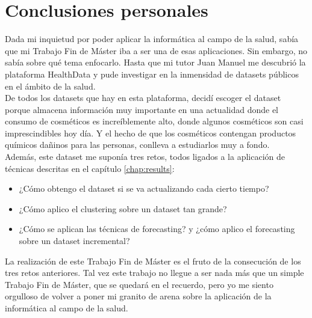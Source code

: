 \newpage
\section{Conclusiones personales}

Dada mi inquietud por poder aplicar la informática al campo de la salud, sabía que mi Trabajo Fin de Máster iba a ser una de esas aplicaciones. Sin embargo, no sabía sobre qué tema enfocarlo. Hasta que mi tutor Juan Manuel me descubrió la plataforma HealthData \citep{healthdata} y pude investigar en la inmensidad de datasets públicos en el ámbito de la salud. \\

De todos los datasets que hay en esta plataforma, decidí escoger el dataset  \citep{dataset} porque almacena información muy importante en una actualidad donde el consumo de cosméticos es increíblemente alto, donde algunos cosméticos son casi imprescindibles hoy día. Y el hecho de que los cosméticos contengan productos químicos dañinos para las personas, conlleva a estudiarlos muy a fondo. \\

Además, este dataset me suponía tres retos, todos ligados a la aplicación de técnicas descritas en el capítulo \ref{chap:results}: 

\begin{itemize}
 \item ¿Cómo obtengo el dataset si se va actualizando cada cierto tiempo?
 \item ¿Cómo aplico el clustering sobre un dataset tan grande?
 \item ¿Cómo se aplican las técnicas de forecasting? y ¿cómo aplico el forecasting sobre un dataset incremental?
\end{itemize}

La realización de este Trabajo Fin de Máster es el fruto de la consecución de los tres retos anteriores. Tal vez este trabajo no llegue a ser nada más que un simple Trabajo Fin de Máster, que se quedará en el recuerdo, pero yo me siento orgulloso de volver a poner mi granito de arena sobre la aplicación de la informática al campo de la salud.


























